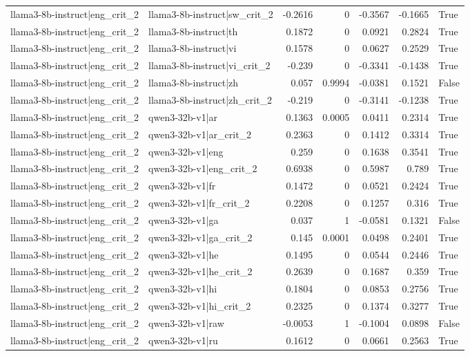 \begin{table}
\begin{tabular}{l l r r r r l}
llama3-8b-instruct|eng_crit_2 & llama3-8b-instruct|sw_crit_2 & -0.2616 & 0 & -0.3567 & -0.1665 & True \\
llama3-8b-instruct|eng_crit_2 & llama3-8b-instruct|th & 0.1872 & 0 & 0.0921 & 0.2824 & True \\
llama3-8b-instruct|eng_crit_2 & llama3-8b-instruct|vi & 0.1578 & 0 & 0.0627 & 0.2529 & True \\
llama3-8b-instruct|eng_crit_2 & llama3-8b-instruct|vi_crit_2 & -0.239 & 0 & -0.3341 & -0.1438 & True \\
llama3-8b-instruct|eng_crit_2 & llama3-8b-instruct|zh & 0.057 & 0.9994 & -0.0381 & 0.1521 & False \\
llama3-8b-instruct|eng_crit_2 & llama3-8b-instruct|zh_crit_2 & -0.219 & 0 & -0.3141 & -0.1238 & True \\
llama3-8b-instruct|eng_crit_2 & qwen3-32b-v1|ar & 0.1363 & 0.0005 & 0.0411 & 0.2314 & True \\
llama3-8b-instruct|eng_crit_2 & qwen3-32b-v1|ar_crit_2 & 0.2363 & 0 & 0.1412 & 0.3314 & True \\
llama3-8b-instruct|eng_crit_2 & qwen3-32b-v1|eng & 0.259 & 0 & 0.1638 & 0.3541 & True \\
llama3-8b-instruct|eng_crit_2 & qwen3-32b-v1|eng_crit_2 & 0.6938 & 0 & 0.5987 & 0.789 & True \\
llama3-8b-instruct|eng_crit_2 & qwen3-32b-v1|fr & 0.1472 & 0 & 0.0521 & 0.2424 & True \\
llama3-8b-instruct|eng_crit_2 & qwen3-32b-v1|fr_crit_2 & 0.2208 & 0 & 0.1257 & 0.316 & True \\
llama3-8b-instruct|eng_crit_2 & qwen3-32b-v1|ga & 0.037 & 1 & -0.0581 & 0.1321 & False \\
llama3-8b-instruct|eng_crit_2 & qwen3-32b-v1|ga_crit_2 & 0.145 & 0.0001 & 0.0498 & 0.2401 & True \\
llama3-8b-instruct|eng_crit_2 & qwen3-32b-v1|he & 0.1495 & 0 & 0.0544 & 0.2446 & True \\
llama3-8b-instruct|eng_crit_2 & qwen3-32b-v1|he_crit_2 & 0.2639 & 0 & 0.1687 & 0.359 & True \\
llama3-8b-instruct|eng_crit_2 & qwen3-32b-v1|hi & 0.1804 & 0 & 0.0853 & 0.2756 & True \\
llama3-8b-instruct|eng_crit_2 & qwen3-32b-v1|hi_crit_2 & 0.2325 & 0 & 0.1374 & 0.3277 & True \\
llama3-8b-instruct|eng_crit_2 & qwen3-32b-v1|raw & -0.0053 & 1 & -0.1004 & 0.0898 & False \\
llama3-8b-instruct|eng_crit_2 & qwen3-32b-v1|ru & 0.1612 & 0 & 0.0661 & 0.2563 & True \\

\end{tabular}
\end{table}
